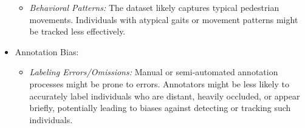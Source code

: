 \begin{itemize}
\begin{itemize}
        \item \textit{Behavioral Patterns:} The dataset likely captures typical pedestrian movements. Individuals with atypical gaits or movement patterns might be tracked less effectively.
    \end{itemize}
    \item Annotation Bias:
    \begin{itemize}
        \item \textit{Labeling Errors/Omissions:} Manual or semi-automated annotation processes might be prone to errors. Annotators might be less likely to accurately label individuals who are distant, heavily occluded, or appear briefly, potentially leading to biases against detecting or tracking such individuals.
    \end{itemize}
\end{itemize}

